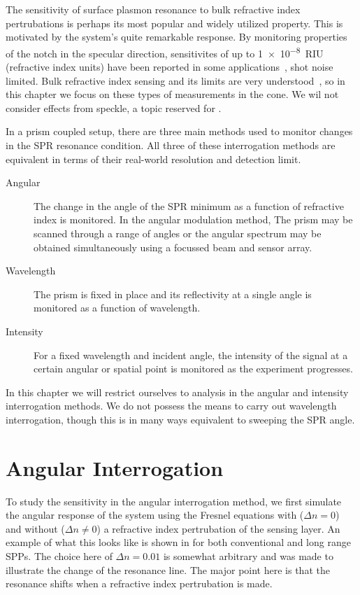The sensitivity of surface plasmon resonance to bulk refractive index
pertrubations is perhaps its most popular and widely utilized property.
This is motivated by the system's quite remarkable response. By monitoring
properties of the notch in the specular direction, sensitivites of up to
\SI{1e-8}{RIU} (refractive index units) have been reported in some
applications~\cite{fan2008sensitive}, shot noise limited.  Bulk refractive
index sensing and its limits are very
understood~\cite{piliarik2009surface}, so in this chapter we focus on these
types of measurements in the cone.  We wil not consider effects from
speckle, a topic reserved for .  

In a prism coupled setup, there are three main methods used to
monitor changes in the SPR resonance condition.  All three of these
interrogation methods are equivalent in terms of their real-world
resolution and detection limit.~\cite{homola2006surface}
\begin{description}
	\item [{Angular}] The change in the angle of the SPR minimum as a function
					of refractive index is monitored.  In the angular modulation method,
					The prism may be scanned through a range of angles or the angular
					spectrum may be obtained simultaneously using a focussed beam and
					sensor array.
 \item [{Wavelength}] The prism is fixed in place and its reflectivity at
  a single angle is monitored as a function of wavelength.
	\item [{Intensity}] For a fixed wavelength and incident angle, the
		intensity of the signal at a certain angular or spatial point is
		monitored as the experiment progresses.
\end{description}
In this chapter we will restrict ourselves to analysis in the angular and
intensity interrogation methods.  We do not possess the means to carry out
wavelength interrogation, though this is in many ways equivalent to
sweeping the SPR angle. 

\section{Angular Interrogation}
To study the sensitivity in the angular interrogation method, we first
simulate the angular response of the system using the Fresnel equations
with ($\Delta n = 0$) and without ($\Delta n \ne 0$) a refractive index
pertrubation of the sensing layer.  An example of what this looks like is
shown in  for both conventional and long range
SPPs.  The choice here of 
$\Delta n = 0.01$ is somewhat arbitrary and was made to 
illustrate the change of the resonance line.  The major point here is that
the resonance shifts when a refractive index pertrubation is made.

